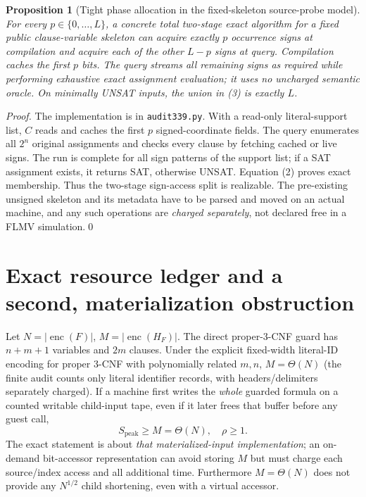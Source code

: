 \documentclass[11pt]{article}
\newtheorem{proposition}{Proposition}
\begin{document}
\begin{proposition}[Tight phase allocation in the fixed-skeleton source-probe model]
For every $p\in\{0,\ldots,L\}$, a \emph{concrete} total two-stage exact algorithm for a fixed public clause-variable skeleton can acquire exactly $p$ occurrence signs at compilation and acquire each of the other $L-p$ signs at query. Compilation caches the first $p$ bits. The query streams all remaining signs as required while performing exhaustive exact assignment evaluation; it uses no uncharged semantic oracle. On minimally UNSAT inputs, the union in (3) is exactly $L$.
\end{proposition}
\begin{proof}
The implementation is in \texttt{audit339.py}. With a read-only literal-support list, $C$ reads and caches the first $p$ signed-coordinate fields. The query enumerates all $2^n$ original assignments and checks every clause by fetching cached or live signs. The run is complete for all sign patterns of the support list; if a SAT assignment exists, it returns SAT, otherwise UNSAT. Equation (2) proves exact membership. Thus the two-stage sign-access split is realizable. The pre-existing unsigned skeleton and its metadata have to be parsed and moved on an actual machine, and any such operations are \emph{charged separately}, not declared free in a FLMV simulation.\qed
\end{proof}

\section{Exact resource ledger and a second, materialization obstruction}
Let $N=|\operatorname{enc}(F)|$, $M=|\operatorname{enc}(H_F)|$. The direct proper-3-CNF guard has $n+m+1$ variables and $2m$ clauses. Under the explicit fixed-width literal-ID encoding for proper 3-CNF with polynomially related $m,n$, $M=\Theta(N)$ (the finite audit counts only literal identifier records, with headers/delimiters separately charged). If a machine first writes the \emph{whole} guarded formula on a counted writable child-input tape, even if it later frees that buffer before any guest call,
\[
\boxed{S_{\mathrm{peak}}\ge M=\Theta(N),\quad \rho\ge1.}\tag{4}
\]
The exact statement is about \emph{that materialized-input implementation}; an on-demand bit-accessor representation can avoid storing $M$ but must charge each source/index access and all additional time. Furthermore $M=\Theta(N)$ does not provide any $N^{1/2}$ child shortening, even with a virtual accessor.
\end{document}
